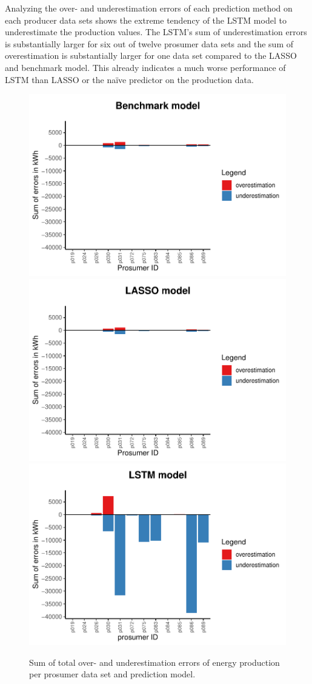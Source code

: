 Analyzing the over- and underestimation errors of each prediction method on each producer data sets shows the extreme tendency of the LSTM model to underestimate the production values. The LSTM's sum of underestimation errors is substantially larger for six out of twelve prosumer data sets and the sum of overestimation is substantially larger for one data set compared to the LASSO and benchmark model. This already indicates a much worse performance of LSTM than LASSO or the na\"ive predictor on the production data.
%
\begin{figure}
    \centering
    \includegraphics[width=.5\textwidth]{thesis/graphs/evaluation/p_barplot_naive_overunderestimation.pdf}\\\vspace{.6cm}
    \includegraphics[width=.5\textwidth]{thesis/graphs/evaluation/p_barplot_LASSO_overunderestimation.pdf}\\\vspace{.6cm}
    \includegraphics[width=.5\textwidth]{thesis/graphs/evaluation/p_barplot_LSTM_overunderestimation.pdf}
    \caption[Sum of total over- and underestimation errors per prosumer data set]{Sum of total over- and underestimation errors of energy production per prosumer data set and prediction model. \quantnet\href{}{}}
    \label{Fig:overunderestimation_p}
\end{figure}
%


